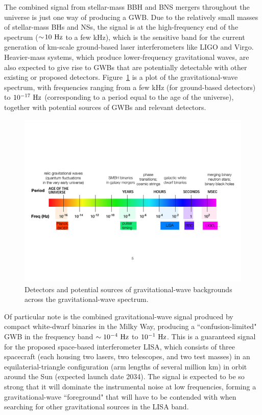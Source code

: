 \documentclass[11pt]{article}
\numberwithin{equation}{section}
\begin{document}
The combined signal from stellar-mass BBH and BNS 
mergers throughout the universe is just one way 
of producing a GWB.
Due to the relatively small masses of stellar-mass 
BHs and NSs, the signal is at the high-frequency 
end of the spectrum ($\sim\!10~{\rm Hz}$ to a few kHz), 
which is the sensitive band for the current generation 
of km-scale ground-based laser interferometers like 
LIGO and Virgo.
Heavier-mass systems, which produce lower-frequency 
gravitational waves, are also expected to give rise 
to GWBs that are potentially detectable with other 
existing or proposed detectors.
Figure~\ref{f:GWspectrum} is a plot of the 
gravitational-wave spectrum, with frequencies ranging
from a few kHz (for ground-based detectors)
to $10^{-17}~{\rm Hz}$ (corresponding to a period
equal to the age of the universe), together with 
potential sources of GWBs and relevant detectors.  
%
\begin{figure}[htbp!]
\begin{center}
\includegraphics[width=\textwidth]{Figures/GWspectrum}
\caption{Detectors and potential sources of gravitational-wave
backgrounds across the gravitational-wave spectrum.}
\label{f:GWspectrum}
\end{center}
\end{figure}
%

Of particular note is the combined gravitational-wave
signal produced by compact white-dwarf binaries in 
the Milky Way, producing a ``confusion-limited" GWB
in the frequency band $\sim 10^{-4}~{\rm Hz}$ to 
$10^{-1}~{\rm Hz}$.
This is a guaranteed signal for the proposed 
space-based interferometer LISA, which consists of
three spacecraft (each housing two lasers, two 
telescopes, and two test masses) in an 
equilaterial-triangle configuration (arm lengths of 
several million km) in orbit around the 
Sun (expected launch date 2034).
The signal is expected to be so strong that it will
dominate the instrumental noise at low frequencies, 
forming a gravitational-wave ``foreground" that will
have to be contended with when searching for other 
gravitational sources in the LISA band.
\end{document}
